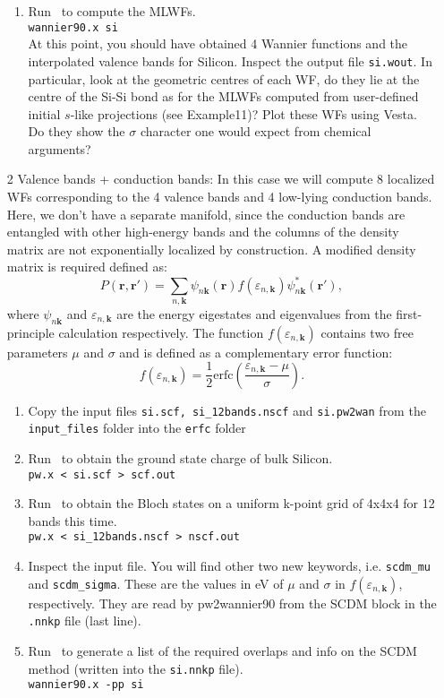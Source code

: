 \documentclass[a4paper,11pt,twoside]{article}
\begin{document}
\begin{itemize}
\begin{enumerate}
    \item Run \wannier\ to compute the MLWFs.\\
    {\tt wannier90.x si}\\
    At this point, you should have obtained 4 Wannier functions and the interpolated valence bands for Silicon. Inspect the output file {\tt si.wout}. In particular, look at the geometric centres of each WF, do they lie at the centre of the Si-Si bond as for the MLWFs computed from user-defined initial $s$-like projections (see Example11)?
    Plot these WFs using Vesta. Do they show the $\sigma$ character one would expect from chemical arguments?
  \end{enumerate}
  \item[2]{Valence bands + conduction bands: In this case we will compute 8 localized WFs corresponding to the 4 valence bands and 4 low-lying conduction bands. Here, we don't have a separate manifold, since the conduction bands are entangled with other high-energy bands and the columns of the density matrix are not exponentially localized by construction. A modified density matrix is required defined as\cite{LinLin-ArXiv2017}: $$P(\mathbf{r},\mathbf{r}') = \sum_{n,\mathbf{k}} \psi_{n\mathbf{k}}(\mathbf{r})f(\varepsilon_{n,\mathbf{k}})\psi_{n\mathbf{k}}^\ast(\mathbf{r}'),$$
  where $\psi_{n\mathbf{k}}$ and $\varepsilon_{n,\mathbf{k}}$ are the energy eigestates and eigenvalues from the first-principle calculation respectively. The function $f(\varepsilon_{n,\mathbf{k}})$ contains two free parameters $\mu$ and $\sigma$ and is defined as a complementary error function: $$f(\varepsilon_{n,\mathbf{k}}) = \frac{1}{2}\mathrm{erfc}\left(\frac{\varepsilon_{n,\mathbf{k}} - \mu}{\sigma}\right).$$ }
  \begin{enumerate}
    \item Copy the input files {\tt si.scf, si\_12bands.nscf} and {\tt si.pw2wan} from the {\tt input\_files} folder into the {\tt erfc} folder
    \item Run \pwscf\ to obtain the ground state charge of bulk Silicon. \\
    {\tt pw.x < si.scf > scf.out}

    \item Run \pwscf\ to obtain the Bloch states on a uniform k-point grid of 4x4x4 for 12 bands this time. \\
    {\tt pw.x < si\_12bands.nscf > nscf.out}
    
    \item Inspect the \wannier input file. You will find other two new keywords, i.e. {\tt scdm\_mu} and {\tt scdm\_sigma}. These are the values in eV of $\mu$ and $\sigma$ in $f(\varepsilon_{n,\mathbf{k}})$, respectively. They are read by pw2wannier90 from the SCDM block in the {\tt .nnkp} file (last line).
    \item Run \wannier\ to generate a list of the required overlaps and info on the SCDM method (written
    into the {\tt si.nnkp} file).\\ 
    {\tt wannier90.x -pp si}


\end{enumerate}
\end{itemize}
\end{document}
